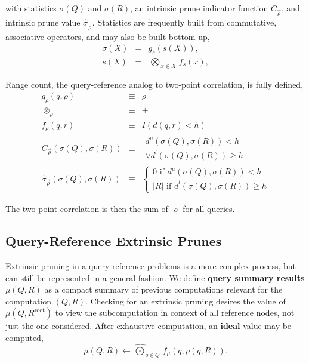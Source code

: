 \documentclass[twoside,leqno,twocolumn]{article}
\newcommand{\summary}{\hat{\sigma}}
\newcommand{\defterm}[1]{{\bf #1}}
\newcommand{\kdroot}[1]{#1^{\text{root}}}
\newcommand{\lo}[1]{#1^{l}}
\newcommand{\up}[1]{#1^{u}}
\newcommand{\distlo}{\lo{d}}
\newcommand{\distup}{\up{d}}
\newcommand{\dist}[2]{d(#1,#2)}
\newcommand{\nameOp}[2]{\mathop{#1\nolimits\!\!_{#2}}}
\newcommand{\nameop}[2]{{\scriptstyle\:}#1_{\!#2}}
\newcommand{\myOp}[1]{\nameOp{\bigotimes}{#1}}
\newcommand{\myop}[1]{\nameop{\otimes}{#1}}
\newcommand{\letterqr}{\rho}
\newcommand{\outqr}{\varrho}
\newcommand{\inqr}{\rho}
\newcommand{\opqr}{\myop{\letterqr}}
\newcommand{\fqr}{f_{\!\letterqr}}
\newcommand{\gqr}{g_{\!\letterqr}}
\newcommand{\letterqrv}{\vec{\rho}}
\newcommand{\deltaqrv}{\summary_{\!\letterqrv}}
\newcommand{\canpruneqrv}{C_{\!\letterqrv}}
\newcommand{\lettermu}{\mu}
\newcommand{\inmu}{\mu}
\newcommand{\Outopmu}{\widehat{\nameOp{\bigodot}{\lettermu}}}%
\newcommand{\fmu}{f_{\!\lettermu}}
\newcommand{\letterstat}{s}
\newcommand{\outstat}{\sigma}
\newcommand{\instat}{s}
\newcommand{\Opstat}{\myOp{\letterstat}}
\newcommand{\fstat}{f_{\!\letterstat}}
\newcommand{\gstat}{g_{\!\letterstat}}
\begin{document}
\noindent
with statistics $\outstat(Q)$ and $\outstat(R)$, an intrinsic prune indicator function $\canpruneqrv$, and intrinsic prune value $\deltaqrv$.
Statistics are frequently built from commutative, associative operators, and may also be built bottom-up,
\begin{eqnarray*}
\outstat(X) &=& \gstat(\instat(X)),
\\
\instat(X) &=& \Opstat_{x \in X} \fstat(x),
\label{eqn:defstat}
\end{eqnarray*}

\noindent
Range count, the query-reference analog to two-point correlation, is fully defined,
\begin{eqnarray*}
\gqr(q, \inqr) &\equiv& \inqr
\\
\opqr &\equiv& +
\\
\fqr(q,r) &\equiv& I(\dist{q}{r} < h)
\\
\canpruneqrv(\outstat(Q), \outstat(R))
&\equiv&
\begin{array}{l}\distup(\outstat(Q),\outstat(R)) < h \\ \vee \distlo(\outstat(Q),\outstat(R)) \geq h\end{array}
\\
\deltaqrv(\outstat(Q),\outstat(R)) &\equiv& \left\{ \begin{array}{l} 0 \text{ if } \distup(\outstat(Q),\outstat(R)) < h \\ |R| \text{ if } \distlo(\outstat(Q),\outstat(R)) \geq h \end{array}\right.
\end{eqnarray*}

\noindent
The two-point correlation is then the sum of $\outqr$ for all queries.

\subsection{Query-Reference Extrinsic Prunes}

Extrinsic pruning in a query-reference problems is a more complex process, but can still be represented in a general fashion.
We define \defterm{query summary results} $\inmu(Q, R)$ as a compact summary of previous computations relevant for the computation $(Q,R)$.
Checking for an extrinsic pruning desires the value of $\inmu(Q, \kdroot{R})$ to view the subcomputation in context of all reference nodes, not just the one considered.
After exhaustive computation, an \defterm{ideal} value may be computed,
\begin{equation*}
\inmu(Q, R) \gets \Outopmu_{q \in Q} \fmu(q, \inqr(q, R)).
\end{equation*}
\end{document}

